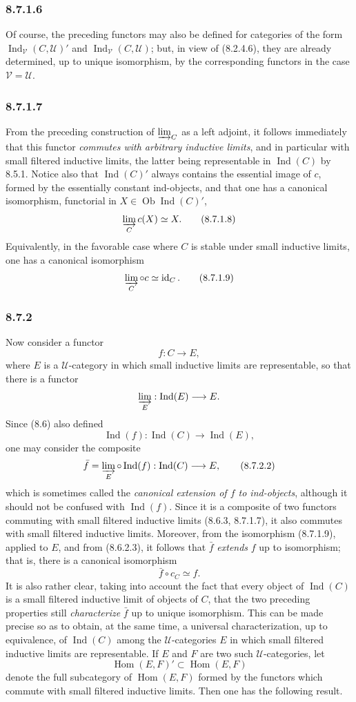 \documentclass[11pt]{article}
\newcommand{\U}{\mathcal{U}}
\newcommand{\V}{\mathcal{V}}
\newcommand{\Ob}{\operatorname{Ob}}
\newcommand{\Ind}{\operatorname{Ind}}
\newcommand{\id}{\operatorname{id}}
\newcommand{\Hhom}{\operatorname{Hom}}
\begin{document}
\subsubsection*{8.7.1.6}
Of course, the preceding functors may also be defined for categories of the form $\Ind_{\V}(C,\U)'$ and $\Ind_{\V}(C,\U)$; but, in view of (8.2.4.6), they are already determined, up to unique isomorphism, by the corresponding functors in the case $\V=\U$.

\subsubsection*{8.7.1.7}
From the preceding construction of $\varinjlim_C$ as a left adjoint, it follows immediately that this functor \emph{commutes with arbitrary inductive limits}, and in particular with small filtered inductive limits, the latter being representable in $\Ind(C)$ by 8.5.1. Notice also that $\Ind(C)'$ always contains the essential image of $c$, formed by the essentially constant ind-objects, and that one has a canonical isomorphism, functorial in $X\in\Ob\Ind(C)'$,
\[
\varinjlim_C c(X)\simeq X.
\tag{8.7.1.8}
\]
Equivalently, in the favorable case where $C$ is stable under small inductive limits, one has a canonical isomorphism
\[
\varinjlim_C\circ c\simeq \id_C.
\tag{8.7.1.9}
\]

\subsubsection*{8.7.2}
Now consider a functor
\[
 f:C\longrightarrow E,
\tag{8.7.2.1}
\]
where $E$ is a $\U$-category in which small inductive limits are representable, so that there is a functor
\[
\varinjlim_E:\Ind(E)\longrightarrow E.
\]
Since (8.6) also defined
\[
\Ind(f):\Ind(C)\longrightarrow \Ind(E),
\]
one may consider the composite
\[
 \bar f=\varinjlim_E\circ\Ind(f):\Ind(C)\longrightarrow E,
\tag{8.7.2.2}
\]
which is sometimes called the \emph{canonical extension of $f$ to ind-objects}, although it should not be confused with $\Ind(f)$. Since it is a composite of two functors commuting with small filtered inductive limits (8.6.3, 8.7.1.7), it also commutes with small filtered inductive limits. Moreover, from the isomorphism (8.7.1.9), applied to $E$, and from (8.6.2.3), it follows that $\bar f$ \emph{extends} $f$ up to isomorphism; that is, there is a canonical isomorphism
\[
 \bar f\circ c_C\simeq f.
\tag{8.7.2.3}
\]
It is also rather clear, taking into account the fact that every object of $\Ind(C)$ is a small filtered inductive limit of objects of $C$, that the two preceding properties still \emph{characterize} $\bar f$ up to unique isomorphism. This can be made precise so as to obtain, at the same time, a universal characterization, up to equivalence, of $\Ind(C)$ among the $\U$-categories $E$ in which small filtered inductive limits are representable. If $E$ and $F$ are two such $\U$-categories, let
\[
\Hhom(E,F)'\subset \Hhom(E,F)
\tag{8.7.2.4}
\]
denote the full subcategory of $\Hhom(E,F)$ formed by the functors which commute with small filtered inductive limits. Then one has the following result.
\end{document}
